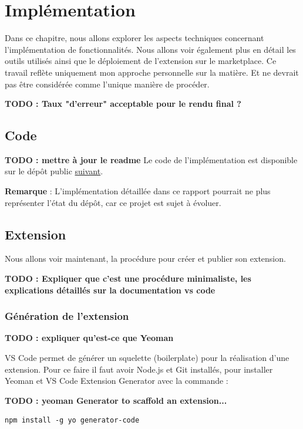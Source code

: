 \documentclass[
    iict, %
    il, %
]{heig-tb}
\begin{document}
\chapter{Implémentation}
Dans ce chapitre, nous allons explorer les aspects techniques concernant l'implémentation de fonctionnalités. Nous allons voir également plus en détail les outils utilisés ainsi que le déploiement de l'extension sur le marketplace.
Ce travail reflète uniquement mon approche personnelle sur la matière. Et ne devrait pas être considérée comme l'unique manière de procéder.

\textbf{TODO : Taux "d'erreur" acceptable pour le rendu final ?}

\section{Code}
\textbf{TODO : mettre à jour le readme}
Le code de l'implémentation est disponible sur le dépôt public \href{https://github.com/vitorva/vscode-uon}{suivant}.

\textbf{Remarque} : L'implémentation détaillée dans ce rapport pourrait ne plus représenter l'état du dépôt, car ce projet est sujet à évoluer.

\section{Extension}
Nous allons voir maintenant, la procédure pour créer et publier son extension.

\textbf{TODO : Expliquer que c'est une procédure minimaliste, les explications détaillés sur la documentation vs code}

\subsection{Génération de l'extension}
\textbf{TODO : expliquer qu'est-ce que Yeoman}

VS Code permet de générer un squelette (boilerplate) pour la réalisation d'une extension. Pour ce faire il faut avoir Node.js et Git installés, pour installer Yeoman et VS Code Extension Generator avec la commande :

\textbf{TODO : yeoman Generator to scaffold an extension...}

\begin{lstlisting}[frame=single,caption={generator-code},label={generator-code}]
npm install -g yo generator-code
\end{lstlisting}
\end{document}
